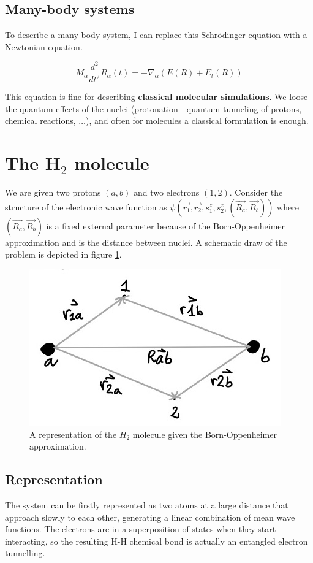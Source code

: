 	\subsection{Many-body systems}
	To describe a many-body system, I can replace this Schr\"odinger equation with a Newtonian equation.

	$$M_\alpha\frac{d^2}{dt^2}R_\alpha(t)=-\nabla_\alpha(E(R)+E_t(R))$$

	This equation is fine for describing \textbf{classical molecular simulations}.
	We loose the quantum effects of the nuclei (protonation - quantum tunneling of protons, chemical reactions, $\dots$), and often for molecules a classical formulation is enough.

\section{The H$_2$ molecule}
We are given two protons $(a,b)$ and two electrons $(1,2)$.
Consider the structure of the electronic wave function as $\psi(\vec{r_1},\vec{r_2},s_1^z,s_2^z,(\vec{R_a},\vec{R_b}))$ where $(\vec{R_a},\vec{R_b})$ is a fixed external parameter because of the Born-Oppenheimer approximation and is the distance between nuclei.
A schematic draw of the problem is depicted in figure \ref{fig:h2}.

\begin{figure}[htbp!]
	\centering
	\includegraphics[scale=0.30]{img_8}
	\caption{A representation of the $H_2$ molecule given the Born-Oppenheimer approximation.}
	\label{fig:h2}
\end{figure}

	\subsection{Representation}
	The system can be firstly represented as two atoms at a large distance that approach slowly to each other, generating a linear combination of mean wave functions.
	The electrons are in a superposition of states when they start interacting, so the resulting H-H chemical bond is actually an entangled electron tunnelling.

